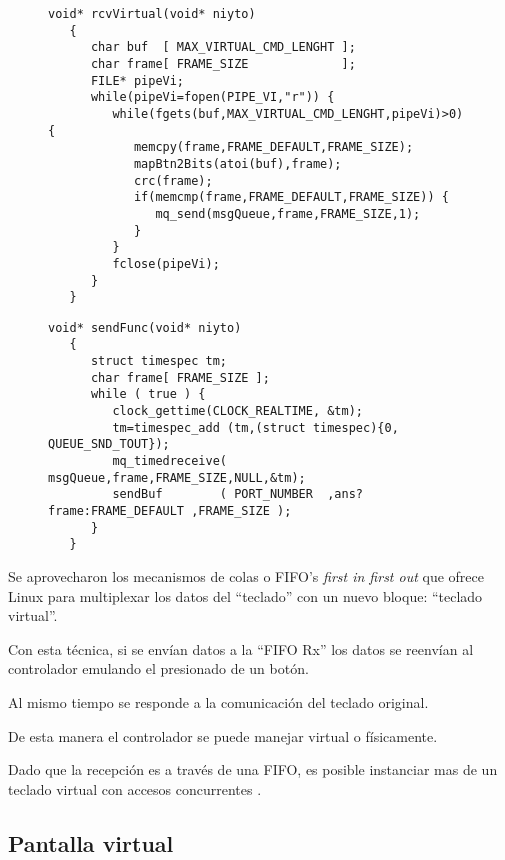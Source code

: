 \begin{figure}
   \begin{lstlisting}[label={cod:handheld1},caption={},title={\lstlistingname~\thelstlisting:Tarea que recibe datos del teclado virtual y los reenvía a la cola de multiplexado.}]
   void* rcvVirtual(void* niyto)
   {
      char buf  [ MAX_VIRTUAL_CMD_LENGHT ];
      char frame[ FRAME_SIZE             ];
      FILE* pipeVi;
      while(pipeVi=fopen(PIPE_VI,"r")) {
         while(fgets(buf,MAX_VIRTUAL_CMD_LENGHT,pipeVi)>0) {
            memcpy(frame,FRAME_DEFAULT,FRAME_SIZE);
            mapBtn2Bits(atoi(buf),frame);
            crc(frame);
            if(memcmp(frame,FRAME_DEFAULT,FRAME_SIZE)) {
               mq_send(msgQueue,frame,FRAME_SIZE,1);
            }
         }
         fclose(pipeVi);
      }
   }
   \end{lstlisting}
\end{figure}

\begin{figure}
   \begin{lstlisting}[label={cod:handheld1},caption={},title={\lstlistingname~\thelstlisting:Tarea de multiplexado de los datos del teclado físico y virtual.}]
   void* sendFunc(void* niyto)
   {
      struct timespec tm;
      char frame[ FRAME_SIZE ];
      while ( true ) {
         clock_gettime(CLOCK_REALTIME, &tm);
         tm=timespec_add (tm,(struct timespec){0, QUEUE_SND_TOUT});
         mq_timedreceive( msgQueue,frame,FRAME_SIZE,NULL,&tm);
         sendBuf        ( PORT_NUMBER  ,ans?frame:FRAME_DEFAULT ,FRAME_SIZE );
      }
   }
   \end{lstlisting}
\end{figure}

   Se aprovecharon los mecanismos de colas o FIFO's \textit{first in first out} que ofrece Linux para multiplexar los datos del ``teclado'' con un nuevo bloque: ``teclado virtual''.\par
      Con esta técnica, si se envían datos a la ``FIFO Rx'' los datos se reenvían al controlador emulando el presionado de un botón.\par
      Al mismo tiempo se responde a la comunicación del teclado original.\par
      De esta manera el controlador se puede manejar virtual o físicamente.\par
      Dado que la recepción es a través de una FIFO, es posible instanciar mas de un teclado virtual con accesos concurrentes \citep{book:embeddedprimer}.

\subsection{Pantalla virtual}

